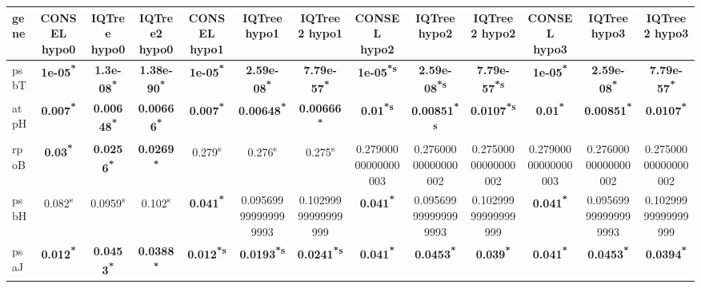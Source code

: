 \documentclass[a4paper]{article}
\begin{document}
\footnotesize
{}
\begin{longtable}{l|c|c|c|c|c|c|c|c|c|c|c|c}
﻿gene&CONSEL hypo0&IQTree hypo0&IQTree2 hypo0&CONSEL hypo1&IQTree hypo1&IQTree2 hypo1&CONSEL hypo2&IQTree hypo2&IQTree2 hypo2&CONSEL hypo3&IQTree hypo3&IQTree2 hypo3\\
\hline
\endhead
psbT&\textbf{1e-05\textsuperscript{*}}&\textbf{1.3e-08\textsuperscript{*}}&\textbf{1.38e-90\textsuperscript{*}}&\textbf{1e-05\textsuperscript{*}}&\textbf{2.59e-08\textsuperscript{*}}&\textbf{7.79e-57\textsuperscript{*}}&\textbf{1e-05\textsuperscript{*}\textsuperscript{s}}&\textbf{2.59e-08\textsuperscript{*}\textsuperscript{s}}&\textbf{7.79e-57\textsuperscript{*}\textsuperscript{s}}&\textbf{1e-05\textsuperscript{*}}&\textbf{2.59e-08\textsuperscript{*}}&\textbf{7.79e-57\textsuperscript{*}}\\
atpH&\textbf{0.007\textsuperscript{*}}&\textbf{0.00648\textsuperscript{*}}&\textbf{0.00666\textsuperscript{*}}&\textbf{0.007\textsuperscript{*}}&\textbf{0.00648\textsuperscript{*}}&\textbf{0.00666\textsuperscript{*}}&\textbf{0.01\textsuperscript{*}\textsuperscript{s}}&\textbf{0.00851\textsuperscript{*}\textsuperscript{s}}&\textbf{0.0107\textsuperscript{*}\textsuperscript{s}}&\textbf{0.01\textsuperscript{*}}&\textbf{0.00851\textsuperscript{*}}&\textbf{0.0107\textsuperscript{*}}\\
rpoB&\textbf{0.03\textsuperscript{*}}&\textbf{0.0256\textsuperscript{*}}&\textbf{0.0269\textsuperscript{*}}&0.279\textsuperscript{s}&0.276\textsuperscript{s}&0.275\textsuperscript{s}&0.27900000000000003&0.27600000000000002&0.27500000000000002&0.27900000000000003&0.27600000000000002&0.27500000000000002\\
psbH&0.082\textsuperscript{s}&0.0959\textsuperscript{s}&0.102\textsuperscript{s}&\textbf{0.041\textsuperscript{*}}&0.095699999999999993&0.10299999999999999&\textbf{0.041\textsuperscript{*}}&0.095699999999999993&0.10299999999999999&\textbf{0.041\textsuperscript{*}}&0.095699999999999993&0.10299999999999999\\
psaJ&\textbf{0.012\textsuperscript{*}}&\textbf{0.0453\textsuperscript{*}}&\textbf{0.0388\textsuperscript{*}}&\textbf{0.012\textsuperscript{*}\textsuperscript{s}}&\textbf{0.0193\textsuperscript{*}\textsuperscript{s}}&\textbf{0.0241\textsuperscript{*}\textsuperscript{s}}&\textbf{0.041\textsuperscript{*}}&\textbf{0.0453\textsuperscript{*}}&\textbf{0.039\textsuperscript{*}}&\textbf{0.041\textsuperscript{*}}&\textbf{0.0453\textsuperscript{*}}&\textbf{0.0394\textsuperscript{*}}\\

\end{longtable}
\end{document}
